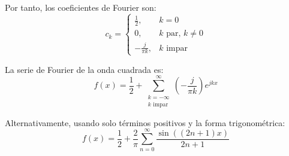 \documentclass[
  11pt,
  letterpaper,
   addpoints,
   answers
  ]{exam}
\begin{document}
\begin{questions}
\begin{solution}
Por tanto, los coeficientes de Fourier son:
\begin{equation}
\boxed{c_k = \begin{cases}
\frac{1}{2}, & k = 0 \\
0, & k \text{ par, } k \neq 0 \\
-\frac{j}{\pi k}, & k \text{ impar}
\end{cases}}
\end{equation}

La serie de Fourier de la onda cuadrada es:
\begin{equation}
\boxed{f(x) = \frac{1}{2} + \sum_{\substack{k=-\infty \\ k \text{ impar}}}^{\infty} \left(-\frac{j}{\pi k}\right)e^{jkx}}
\end{equation}

Alternativamente, usando solo términos positivos y la forma trigonométrica:
\begin{equation}
\boxed{f(x) = \frac{1}{2} + \frac{2}{\pi}\sum_{n=0}^{\infty} \frac{\sin((2n+1)x)}{2n+1}}
\end{equation}

\end{solution}

\end{questions}
\end{document}

